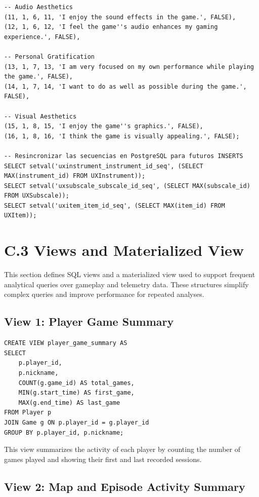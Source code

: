 \documentclass[11pt]{article}
\begin{document}
\begin{lstlisting}[style=sqlstyle]
-- Audio Aesthetics
(11, 1, 6, 11, 'I enjoy the sound effects in the game.', FALSE),
(12, 1, 6, 12, 'I feel the game''s audio enhances my gaming experience.', FALSE),
 
-- Personal Gratification
(13, 1, 7, 13, 'I am very focused on my own performance while playing the game.', FALSE),
(14, 1, 7, 14, 'I want to do as well as possible during the game.', FALSE),
 
-- Visual Aesthetics
(15, 1, 8, 15, 'I enjoy the game''s graphics.', FALSE),
(16, 1, 8, 16, 'I think the game is visually appealing.', FALSE);
 
-- Resincronizar las secuencias en PostgreSQL para futuros INSERTS
SELECT setval('uxinstrument_instrument_id_seq', (SELECT MAX(instrument_id) FROM UXInstrument));
SELECT setval('uxsubscale_subscale_id_seq', (SELECT MAX(subscale_id) FROM UXSubscale));
SELECT setval('uxitem_item_id_seq', (SELECT MAX(item_id) FROM UXItem));
\end{lstlisting}

\clearpage
\section{C.3 Views and Materialized View}
This section defines SQL views and a materialized view used to support frequent analytical queries over gameplay and telemetry data. These structures simplify complex queries and improve performance for repeated analyses.

\subsection{View 1: Player Game Summary}

\begin{lstlisting}[style=sqlstyle]
CREATE VIEW player_game_summary AS
SELECT
    p.player_id,
    p.nickname,
    COUNT(g.game_id) AS total_games,
    MIN(g.start_time) AS first_game,
    MAX(g.end_time) AS last_game
FROM Player p
JOIN Game g ON p.player_id = g.player_id
GROUP BY p.player_id, p.nickname;
\end{lstlisting}

This view summarizes the activity of each player by counting the number of games played and showing their first and last recorded sessions.

\bigskip

\subsection{View 2: Map and Episode Activity Summary}
\end{document}
